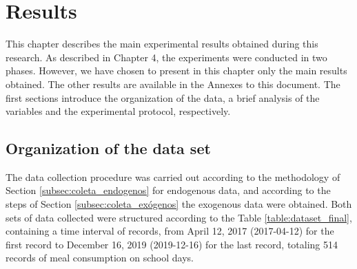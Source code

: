 \chapter{Results} \label{cap:resultados}



This chapter describes the main experimental results obtained during this research. As described in Chapter 4, the experiments were conducted in two phases. However, we have chosen to present in this chapter only the main results obtained. The other results are available in the Annexes to this document. The first sections introduce the organization of the data, a brief analysis of the variables and the experimental protocol, respectively.

\section{Organization of the data set}

    The data collection procedure was carried out according to the methodology of Section \ref{subsec:coleta_endogenos} for endogenous data, and according to the steps of Section \ref{subsec:coleta_exógenos} the exogenous data were obtained.
    Both sets of data collected were structured according to the Table \ref{table:dataset_final}, containing a time interval of records, from April 12, 2017 (2017-04-12) for the first record to December 16, 2019 (2019-12-16) for the last record, totaling 514 records of meal consumption on school days.
    
